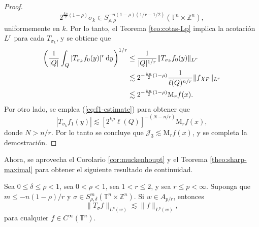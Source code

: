 \begin{proof}
\begin{equation*}
	2^{\frac{kn}{2}(1-\rho)}\sigma_k \in S_{\rho, \rho}^{-n(1-\rho)(1/r-1/2)} (\mathbb{T}^n \times \mathbb{Z}^n),
\end{equation*}
uniformemente en $k$. Por lo tanto, el Teorema \ref{teo:cotas-Lp} implica la acotación $L^r$ para cada $T_{\sigma_k}$, y se obtiene que
\begin{align*}
	\left( \frac{1}{|Q|}\int_Q |T_{\sigma_k}f_0(y)|^r \mathop{}\!\mathrm{d} y
	\right)^{1/r} & \leq \frac{1}{|Q|^{1/r}} \|T_{\sigma_k}f_0(y)\|_{L^r} \\
	& \lesssim 2^{-\frac{kn}{2}(1-\rho)} \frac{1}{\ell(Q)^{n/r}} \|f\chi_P\|_{L^r} \\
	& \lesssim2^{-\frac{kn}{2}(1-\rho)} \mathrm{M}_rf(x).
\end{align*}
Por otro lado, se emplea (\ref{eq:f1-estimate}) para obtener que
\begin{equation*}
	|T_{\sigma_k}f_1(y)| \lesssim[2^{k\rho}\ell(Q)]^{-(N-n/r)} \mathrm{M}_rf(x),
\end{equation*}
donde $N>n/r$. Por lo tanto se concluye que $\mathcal{J}_3 \lesssim\mathrm{M}_rf(x)$, y se completa la demostración.
\end{proof}
Ahora, se aprovecha el Corolario \ref{cor:muckenhoupt} y el Teorema \ref{theo:sharp-maximal} para obtener el siguiente resultado de continuidad.
\begin{corollary}
Sea $0\leq \delta \leq \rho < 1$, sea $0<\rho<1$, sea $1<r\leq 2$, y sea $r\leq p < \infty$. Suponga que $m\leq -n(1-\rho)/r$ y $\sigma\in S^m_{\rho,\delta}(\mathbb{T}^n\times\mathbb{Z}^n)$. Si $w \in A_{p/r}$, entonces 
\begin{equation*}
	\|T_\sigma f\|_{L^p(w)} \lesssim\|f\|_{L^p(w)},
\end{equation*}
para cualquier $f\in C^\infty(\mathbb{T}^n)$.
\end{corollary}
